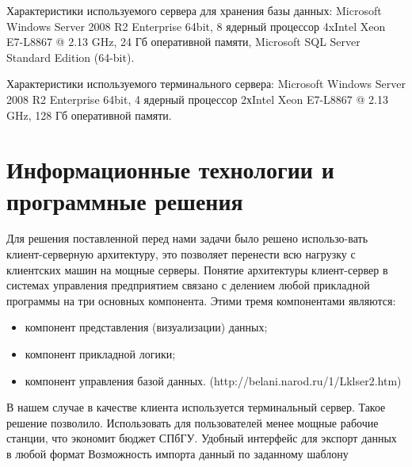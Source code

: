 \documentclass[]{article}
\begin{document}
Характеристики используемого сервера для хранения базы данных: Microsoft Windows Server 2008 R2 Enterprise 64bit, 8 ядерный процессор 4xIntel Xeon E7-L8867 @ 2.13 GHz, 24 Гб оперативной памяти, Microsoft SQL Server Standard Edition (64-bit).

Характеристики используемого терминального сервера: Microsoft Windows Server 2008 R2 Enterprise 64bit, 4 ядерный процессор 2хIntel Xeon E7-L8867 @ 2.13 GHz, 128 Гб оперативной памяти.

\section{Информационные технологии и программные решения}
Для решения поставленной перед нами задачи было решено использо-вать клиент-серверную архитектуру, это позволяет перенести всю нагрузку с клиентских машин на мощные серверы. Понятие архитектуры клиент-сервер в системах управления предприятием связано с делением любой прикладной программы на три основных компонента. Этими тремя компонентами являются:
\begin{itemize}
\item компонент представления (визуализации) данных;
\item компонент прикладной логики;
\item компонент управления базой данных. (http://belani.narod.ru/1/Lklser2.htm)
\end{itemize}
В нашем случае в качестве клиента используется терминальный сервер.  Такое решение позволило. Использовать для пользователей менее мощные рабочие станции, что экономит бюджет СПбГУ.
Удобный интерфейс для экспорт данных в любой формат
Возможность импорта данный по заданному шаблону
\end{document}
